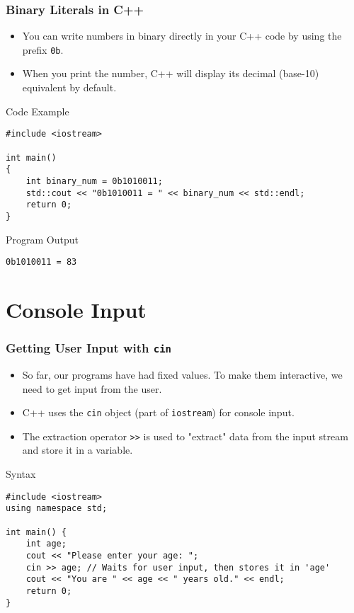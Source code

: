 \documentclass{beamer}
\begin{document}
\begin{frame}[fragile]
\frametitle{Binary Literals in C++}
\begin{itemize}
    \item You can write numbers in binary directly in your C++ code by using the prefix \texttt{0b}.
    \item When you print the number, C++ will display its decimal (base-10) equivalent by default.
\end{itemize}

\begin{block}{Code Example}
\begin{verbatim}
#include <iostream>

int main()
{
    int binary_num = 0b1010011;
    std::cout << "0b1010011 = " << binary_num << std::endl;
    return 0;
}
\end{verbatim}
\end{block}

\begin{block}{Program Output}
\begin{verbatim}
0b1010011 = 83
\end{verbatim}
\end{block}
\end{frame}

\section{Console Input}

\begin{frame}[fragile]
\frametitle{Getting User Input with \texttt{cin}}
\begin{itemize}
    \item So far, our programs have had fixed values. To make them interactive, we need to get input from the user.
    \item C++ uses the \texttt{cin} object (part of \texttt{iostream}) for console input.
    \item The \alert{extraction operator \texttt{>>}} is used to "extract" data from the input stream and store it in a variable.
\end{itemize}

\begin{block}{Syntax}
\begin{verbatim}
#include <iostream>
using namespace std;

int main() {
    int age;
    cout << "Please enter your age: ";
    cin >> age; // Waits for user input, then stores it in 'age'
    cout << "You are " << age << " years old." << endl;
    return 0;
}
\end{verbatim}
\end{block}
\end{frame}
\end{document}
